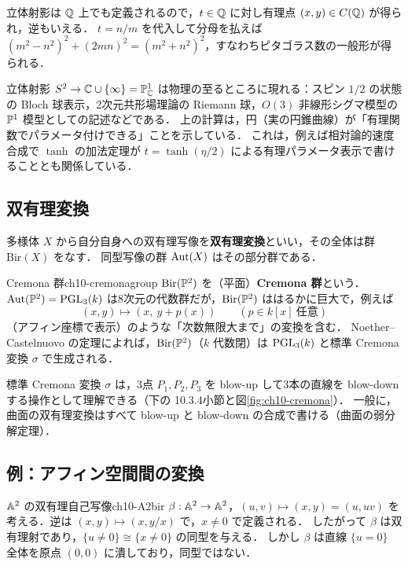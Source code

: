 \begin{note}
立体射影は $\mathbb{Q}$ 上でも定義されるので，$t\in\mathbb{Q}$ に対し有理点 $(x,y)\in C(\mathbb{Q})$ が得られ，逆もいえる．
$t=n/m$ を代入して分母を払えば $(m^2-n^2)^2+(2mn)^2=(m^2+n^2)^2$，すなわちピタゴラス数の一般形が得られる．
\end{note}

\begin{physbox}[立体射影と物理]
立体射影 $S^2\to\mathbb{C}\cup\{\infty\}=\mathbb{P}^1_{\mathbb{C}}$ は物理の至るところに現れる：スピン $1/2$ の状態の Bloch 球表示，2次元共形場理論の Riemann 球，$O(3)$ 非線形シグマ模型の $\mathbb{P}^1$ 模型としての記述などである．
上の計算は，円（実の円錐曲線）が「有理関数でパラメータ付けできる」ことを示している．
これは，例えば相対論的速度合成で $\tanh$ の加法定理が $t=\tanh(\eta/2)$ による有理パラメータ表示で書けることとも関係している．
\end{physbox}

\subsection{双有理変換}

多様体 $X$ から自分自身への双有理写像を\textbf{双有理変換}といい，その全体は群 $\mathrm{Bir}(X)$ をなす．
同型写像の群 $\operatorname{Aut}(X)$ はその部分群である．

\begin{myex}{Cremona 群}{ch10-cremonagroup}
$\mathrm{Bir}(\mathbb{P}^2)$ を（平面）\textbf{Cremona 群}という．
$\operatorname{Aut}(\mathbb{P}^2)=\operatorname{PGL}_3(k)$ は8次元の代数群だが，$\mathrm{Bir}(\mathbb{P}^2)$ ははるかに巨大で，例えば
\[
  (x,y)\mapsto(x,\ y+p(x))\qquad(p\in k[x]\ \text{任意})
\]
（アフィン座標で表示）のような「次数無限大まで」の変換を含む．
Noether--Castelnuovo の定理によれば，$\mathrm{Bir}(\mathbb{P}^2)$（$k$ 代数閉）は $\operatorname{PGL}_3(k)$ と標準 Cremona 変換 $\sigma$ で生成される．
\end{myex}

標準 Cremona 変換 $\sigma$ は，3点 $P_1,P_2,P_3$ を blow-up して3本の直線を blow-down する操作として理解できる（下の 10.3.4小節と図\ref{fig:ch10-cremona}）．
一般に，曲面の双有理変換はすべて blow-up と blow-down の合成で書ける（曲面の弱分解定理）．

\subsection{例：アフィン空間間の変換}

\begin{myex}{$\mathbb{A}^2$ の双有理自己写像}{ch10-A2bir}
$\beta:\mathbb{A}^2\to\mathbb{A}^2$，$(u,v)\mapsto(x,y)=(u,uv)$ を考える．逆は $(x,y)\mapsto(x,y/x)$ で，$x\neq0$ で定義される．
したがって $\beta$ は双有理射であり，$\{u\neq0\}\cong\{x\neq0\}$ の同型を与える．
しかし $\beta$ は直線 $\{u=0\}$ 全体を原点 $(0,0)$ に潰しており，同型ではない．
\end{myex}

